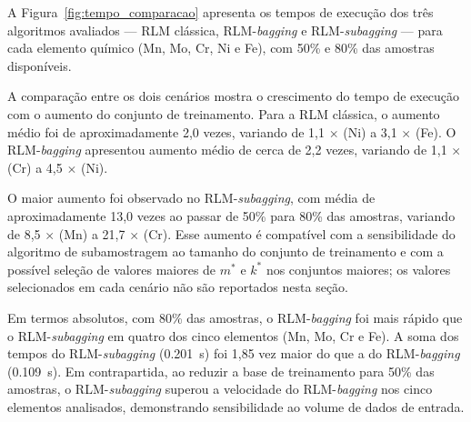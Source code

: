\begin{figure}[htbp]
\begin{minipage}{0.48\textwidth}
{
}%
\end{minipage}

\end{figure}



A Figura~\ref{fig:tempo_comparacao} apresenta os tempos de execução dos três algoritmos avaliados --- RLM clássica, RLM-\textit{bagging} e RLM-\textit{subagging} --- para cada elemento químico (Mn, Mo, Cr, Ni e Fe), com 50\% e 80\% das amostras disponíveis.

A comparação entre os dois cenários mostra o crescimento do tempo de execução com o aumento do conjunto de treinamento. Para a RLM clássica, o aumento médio foi de aproximadamente 2,0 vezes, variando de 1,1 $\times$ (Ni) a 3,1 $\times$ (Fe). O RLM-\textit{bagging} apresentou aumento médio de cerca de 2,2 vezes, variando de 1,1 $\times$ (Cr) a 4,5 $\times$ (Ni).

O maior aumento foi observado no RLM-\textit{subagging}, com média de aproximadamente 13,0 vezes ao passar de 50\% para 80\% das amostras, variando de 8,5 $\times$ (Mn) a 21,7 $\times$ (Cr). Esse aumento é compatível com a sensibilidade do algoritmo de subamostragem ao tamanho do conjunto de treinamento e com a possível seleção de valores maiores de $m^*$ e $k^*$ nos conjuntos maiores; os valores selecionados em cada cenário não são reportados nesta seção.

Em termos absolutos, com 80\% das amostras, o RLM-\textit{bagging} foi mais rápido que o RLM-\textit{subagging} em quatro dos cinco elementos (Mn, Mo, Cr e Fe). A soma dos tempos do RLM-\textit{subagging} (\num{0,201}~s) foi 1,85 vez maior do que a do RLM-\textit{bagging} (\num{0,109}~s). Em contrapartida, ao reduzir a base de treinamento para 50\% das amostras, o RLM-\textit{subagging} superou a velocidade do RLM-\textit{bagging} nos cinco elementos analisados, demonstrando sensibilidade ao volume de dados de entrada.


